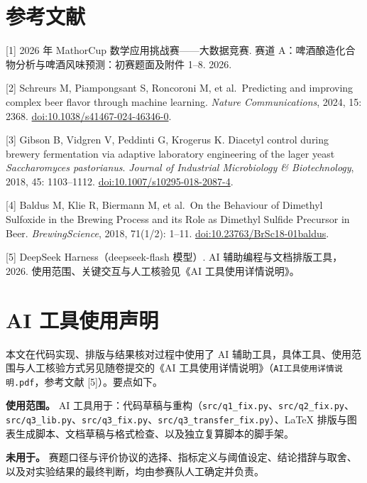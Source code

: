\documentclass[11pt,a4paper]{article}
\begin{document}
\section*{参考文献}\label{ux53c2ux8003ux6587ux732e}

{[}1{]} 2026 年 MathorCup 数学应用挑战赛------大数据竞赛. 赛道
A：啤酒酿造化合物分析与啤酒风味预测：初赛题面及附件 1--8. 2026.

{[}2{]} Schreurs M, Piampongsant S, Roncoroni M, et al.~Predicting and
improving complex beer flavor through machine learning. \emph{Nature
Communications}, 2024, 15: 2368.
\href{https://doi.org/10.1038/s41467-024-46346-0}{doi:10.1038/s41467-024-46346-0}.

{[}3{]} Gibson B, Vidgren V, Peddinti G, Krogerus K. Diacetyl control
during brewery fermentation via adaptive laboratory engineering of the
lager yeast \emph{Saccharomyces pastorianus}. \emph{Journal of
Industrial Microbiology \& Biotechnology}, 2018, 45: 1103--1112.
\href{https://doi.org/10.1007/s10295-018-2087-4}{doi:10.1007/s10295-018-2087-4}.

{[}4{]} Baldus M, Klie R, Biermann M, et al.~On the Behaviour of
Dimethyl Sulfoxide in the Brewing Process and its Role as Dimethyl
Sulfide Precursor in Beer. \emph{BrewingScience}, 2018, 71(1/2): 1--11.
\href{https://doi.org/10.23763/BrSc18-01baldus}{doi:10.23763/BrSc18-01baldus}.

{[}5{]} DeepSeek Harness（deepseek-flash 模型）. AI
辅助编程与文档排版工具，2026. 使用范围、关键交互与人工核验见《AI
工具使用详情说明》。

\section*{AI
工具使用声明}\label{ai-ux5de5ux5177ux4f7fux7528ux58f0ux660e}

本文在代码实现、排版与结果核对过程中使用了 AI
辅助工具，具体工具、使用范围与人工核验方式另见随卷提交的《AI
工具使用详情说明》（\texttt{AI工具使用详情说明.pdf}，参考文献
{[}5{]}）。要点如下。

\textbf{使用范围。} AI
工具用于：代码草稿与重构（\texttt{src/\allowbreak{}q1\_fix.py}、\texttt{src/\allowbreak{}q2\_fix.py}、\texttt{src/\allowbreak{}q3\_lib.py}、\texttt{src/\allowbreak{}q3\_fix.py}、\texttt{src/\allowbreak{}q3\_transfer\_fix.py}）、LaTeX
排版与图表生成脚本、文档草稿与格式检查、以及独立复算脚本的脚手架。

\textbf{未用于。}
赛题口径与评价协议的选择、指标定义与阈值设定、结论措辞与取舍、以及对实验结果的最终判断，均由参赛队人工确定并负责。
\end{document}
